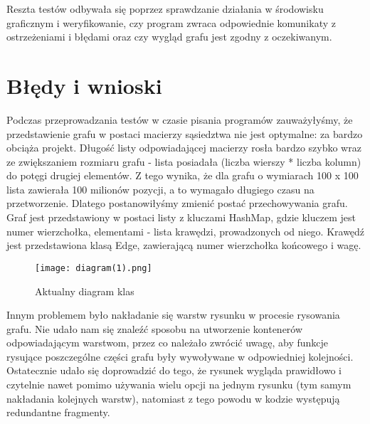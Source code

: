 \documentclass[]{article}
\begin{document}
Reszta testów odbywała się poprzez sprawdzanie działania w środowisku graficznym i weryfikowanie, czy program zwraca odpowiednie komunikaty z ostrzeżeniami i błędami oraz czy wygląd grafu jest zgodny z oczekiwanym.


\section{Błędy i wnioski}\label{header-n233}

Podczas przeprowadzania testów w czasie pisania programów zauważyłyśmy, że przedstawienie grafu w postaci macierzy sąsiedztwa nie jest optymalne: za bardzo obciąża projekt. Długość listy odpowiadającej macierzy rosła bardzo szybko wraz ze zwiększaniem rozmiaru grafu - lista posiadała (liczba wierszy * liczba kolumn) do potęgi drugiej elementów. Z tego wynika, że dla grafu o wymiarach 100 x 100 lista zawierała 100 milionów pozycji, a to wymagało długiego czasu na przetworzenie. Dlatego postanowiłyśmy zmienić postać przechowywania grafu. Graf jest przedstawiony w postaci listy z kluczami HashMap, gdzie kluczem jest numer wierzchołka, elementami - lista krawędzi, prowadzonych od niego. Krawędź jest przedstawiona klasą Edge, zawierającą numer wierzchołka końcowego i wagę. 


\begin{figure}[H]
  \texttt{[image: diagram(1).png]}
  \caption{Aktualny diagram klas}
  \label{fig:graf}
\end{figure}

Innym problemem było nakładanie się warstw rysunku w procesie rysowania grafu. Nie udało nam się znaleźć sposobu na utworzenie kontenerów odpowiadającym warstwom, przez co należało zwrócić uwagę, aby funkcje rysujące poszczególne części grafu były wywoływane w odpowiedniej kolejności. Ostatecznie udało się doprowadzić do tego, że rysunek wygląda prawidłowo i czytelnie nawet pomimo używania wielu opcji na jednym rysunku (tym samym nakładania kolejnych warstw), natomiast z tego powodu w kodzie występują redundantne fragmenty.
\end{document}
